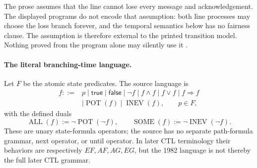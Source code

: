 The prose assumes that the line cannot lose every message and
acknowledgement.  The displayed programs do not encode that assumption:
both line processes may choose the loss branch forever, and the temporal
semantics below has no fairness clause.  The assumption is therefore external
to the printed transition model.  Nothing proved from the program alone may
silently use it \cite[pp.~340--343]{QueilleSifakis1982}.

\paragraph{The literal branching-time language.}
Let \(F\) be the atomic state predicates.  The source language is
\[
\begin{aligned}
 f::={}&p\mid\mathsf{true}\mid\mathsf{false}\mid
 \neg f\mid f\land f\mid f\lor f\mid f\Rightarrow f\\
 &\mid\operatorname{POT}(f)\mid\operatorname{INEV}(f),
 \qquad p\in F,
\end{aligned}
\]
with the defined duals
\[
 \operatorname{ALL}(f):=\neg\operatorname{POT}(\neg f),
 \qquad
 \operatorname{SOME}(f):=\neg\operatorname{INEV}(\neg f).
\]
These are unary state-formula operators; the source has no separate
path-formula grammar, next operator, or until operator.  In later CTL
terminology their behaviors are respectively \(EF,AF,AG,EG\), but the 1982
language is not thereby the full later CTL grammar.

